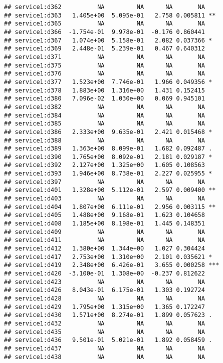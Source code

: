 \documentclass[
]{article}
\begin{document}
\begin{verbatim}
## service1:d362          NA         NA      NA       NA    
## service1:d363   1.405e+00  5.095e-01   2.758 0.005811 ** 
## service1:d365          NA         NA      NA       NA    
## service1:d366  -1.754e-01  9.978e-01  -0.176 0.860441    
## service1:d367   1.074e+00  5.158e-01   2.082 0.037366 *  
## service1:d369   2.448e-01  5.239e-01   0.467 0.640312    
## service1:d371          NA         NA      NA       NA    
## service1:d375          NA         NA      NA       NA    
## service1:d376          NA         NA      NA       NA    
## service1:d377   1.523e+00  7.746e-01   1.966 0.049356 *  
## service1:d378   1.883e+00  1.316e+00   1.431 0.152415    
## service1:d380   7.096e-02  1.030e+00   0.069 0.945101    
## service1:d382          NA         NA      NA       NA    
## service1:d384          NA         NA      NA       NA    
## service1:d385          NA         NA      NA       NA    
## service1:d386   2.333e+00  9.635e-01   2.421 0.015468 *  
## service1:d388          NA         NA      NA       NA    
## service1:d389   1.363e+00  8.099e-01   1.682 0.092487 .  
## service1:d390   1.765e+00  8.092e-01   2.181 0.029187 *  
## service1:d392   2.127e+00  1.325e+00   1.605 0.108563    
## service1:d393   1.946e+00  8.738e-01   2.227 0.025955 *  
## service1:d397          NA         NA      NA       NA    
## service1:d401   1.328e+00  5.112e-01   2.597 0.009400 ** 
## service1:d403          NA         NA      NA       NA    
## service1:d404   1.807e+00  6.111e-01   2.956 0.003115 ** 
## service1:d405   1.488e+00  9.168e-01   1.623 0.104658    
## service1:d408   1.185e+00  8.198e-01   1.445 0.148351    
## service1:d409          NA         NA      NA       NA    
## service1:d411          NA         NA      NA       NA    
## service1:d412   1.380e+00  1.344e+00   1.027 0.304424    
## service1:d417   2.753e+00  1.310e+00   2.101 0.035621 *  
## service1:d419   2.348e+00  6.426e-01   3.655 0.000258 ***
## service1:d420  -3.100e-01  1.308e+00  -0.237 0.812622    
## service1:d423          NA         NA      NA       NA    
## service1:d426   8.043e-01  6.175e-01   1.303 0.192724    
## service1:d428          NA         NA      NA       NA    
## service1:d429   1.795e+00  1.315e+00   1.365 0.172247    
## service1:d430   1.571e+00  8.274e-01   1.899 0.057623 .  
## service1:d432          NA         NA      NA       NA    
## service1:d435          NA         NA      NA       NA    
## service1:d436   9.501e-01  5.021e-01   1.892 0.058459 .  
## service1:d437          NA         NA      NA       NA    
## service1:d438          NA         NA      NA       NA    

\end{verbatim}
\end{document}
